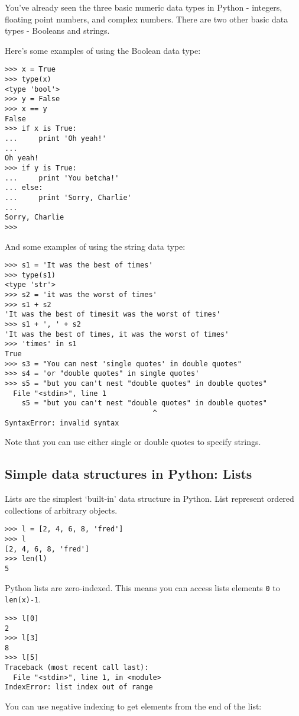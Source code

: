 \documentclass{article}
\begin{document}
You've already seen the three basic numeric data types in Python -
integers, floating point numbers, and complex numbers. There are two
other basic data types - Booleans and strings.

Here's some examples of using the Boolean data type:

\begin{lstlisting}
>>> x = True
>>> type(x)
<type 'bool'>
>>> y = False
>>> x == y
False
>>> if x is True:
...     print 'Oh yeah!'
... 
Oh yeah!
>>> if y is True:
...     print 'You betcha!'
... else:
...     print 'Sorry, Charlie'
... 
Sorry, Charlie
>>>
\end{lstlisting}
And some examples of using the string data type:

\begin{lstlisting}
>>> s1 = 'It was the best of times'
>>> type(s1)
<type 'str'>
>>> s2 = 'it was the worst of times'
>>> s1 + s2
'It was the best of timesit was the worst of times'
>>> s1 + ', ' + s2
'It was the best of times, it was the worst of times'
>>> 'times' in s1
True
>>> s3 = "You can nest 'single quotes' in double quotes"
>>> s4 = 'or "double quotes" in single quotes'
>>> s5 = "but you can't nest "double quotes" in double quotes"
  File "<stdin>", line 1
    s5 = "but you can't nest "double quotes" in double quotes"
                                   ^
SyntaxError: invalid syntax
\end{lstlisting}
Note that you can use either single or double quotes to specify strings.

\subsection{Simple data structures in Python: Lists}

Lists are the simplest `built-in' data structure in Python. List
represent ordered collections of arbitrary objects.

\begin{lstlisting}
>>> l = [2, 4, 6, 8, 'fred']
>>> l
[2, 4, 6, 8, 'fred']
>>> len(l)
5
\end{lstlisting}
Python lists are zero-indexed. This means you can access lists elements
\lstinline!0! to \lstinline!len(x)-1!.

\begin{lstlisting}
>>> l[0]
2
>>> l[3]
8
>>> l[5]
Traceback (most recent call last):
  File "<stdin>", line 1, in <module>
IndexError: list index out of range
\end{lstlisting}
You can use negative indexing to get elements from the end of the list:
\end{document}
